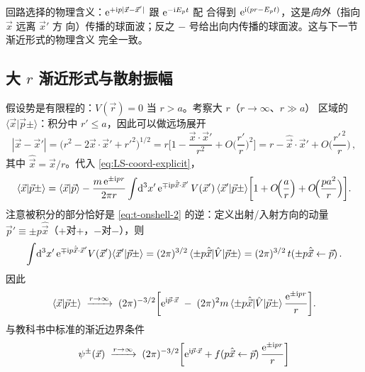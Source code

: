 \begin{remark}
回路选择的物理含义：$\mathrm{e}^{+\mathrm{i} p|\vec x-\vec x'|}$ 跟 $\mathrm{e}^{-\mathrm{i} E_p t}$ 配
合得到 $\mathrm{e}^{\mathrm{i}(pr-E_p t)}$，这是\emph{向外}（指向 $\vec x$ 远离 $\vec x'$ 方
向）传播的球面波；反之 $-$ 号给出向内传播的球面波。这与下一节渐近形式的物理含义
完全一致。
\end{remark}

\subsection{大 $r$ 渐近形式与散射振幅}

假设势是有限程的：$V(\vec r)=0$ 当 $r>a$。考察大 $r$（$r\to\infty$、$r\gg a$）
区域的 $\langle\vec x|\vec p\pm\rangle$：积分中 $r'\le a$，因此可以做远场展开
\begin{equation}
  |\vec x-\vec x'| = \big(r^2 - 2\vec x\cdot\vec x' + r'^2\big)^{1/2}
  = r\Big[1 - \frac{\vec x\cdot\vec x'}{r^2} + O\!\Big(\frac{r'}{r}\Big)^2\Big]
  = r - \hat{\vec x}\cdot\vec x' + O\!\Big(\frac{r'^{\,2}}{r}\Big)\,,
\end{equation}
其中 $\hat{\vec x}=\vec x/r$。代入 \eqref{eq:LS-coord-explicit}，
\begin{equation}
  \langle\vec x|\vec p\pm\rangle
  = \langle\vec x|\vec p\rangle
  - \frac{m\,\mathrm{e}^{\pm \mathrm{i} p r}}{2\pi r}\int\!\mathrm{d}^3 x'\,
    \mathrm{e}^{\mp \mathrm{i} p\hat{\vec x}\cdot\vec x'}\,V(\vec x')\,
    \langle\vec x'|\vec p\pm\rangle
    \!\left[1+O\!\Big(\frac{a}{r}\Big)+O\!\Big(\frac{p a^2}{r}\Big)\right]\!.
\end{equation}
注意被积分的部分恰好是 \eqref{eq:t-onshell-2} 的逆：定义出射/入射方向的动量
$\vec p'\equiv \pm p\hat{\vec x}$（$+$对$+$，$-$对$-$），则
\begin{equation}
  \int\!\mathrm{d}^3 x'\,\mathrm{e}^{\mp \mathrm{i} p\hat{\vec x}\cdot\vec x'}V(\vec x')
  \langle\vec x'|\vec p\pm\rangle
  = (2\pi)^{3/2}\,\langle \pm p\hat{\vec x}|\hat{V}|\vec p\pm\rangle
  = (2\pi)^{3/2}\,t(\pm p\hat{\vec x}\leftarrow \vec p)\,.
\end{equation}
因此
\begin{equation}
  \langle\vec x|\vec p\pm\rangle
  \;\xrightarrow{r\to\infty}\;
  (2\pi)^{-3/2}\!\left[\mathrm{e}^{\mathrm{i}\vec p\cdot\vec x}
  \;-\;(2\pi)^2 m\,\langle \pm p\hat{\vec x}|\hat{V}|\vec p\pm\rangle\,
  \frac{\mathrm{e}^{\pm\mathrm{i} p r}}{r}\right]\!.
  \label{eq:asymp-derived}
\end{equation}
与教科书中标准的渐近边界条件
\begin{equation}
  \psi^\pm(\vec x)\;\xrightarrow{r\to\infty}\;
  (2\pi)^{-3/2}\!\left[\mathrm{e}^{\mathrm{i}\vec p\cdot\vec x}
  + f(p\hat{\vec x}\leftarrow\vec p)\,\frac{\mathrm{e}^{\pm\mathrm{i} p r}}{r}\right]
  \label{eq:asymp-textbook}
\end{equation}
